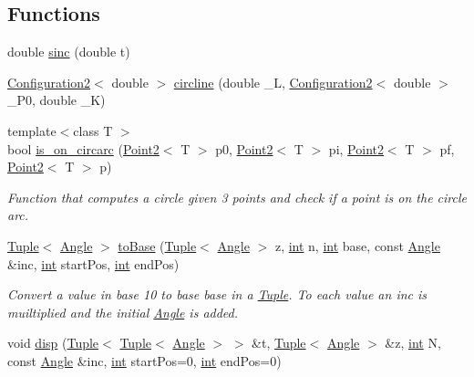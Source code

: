 \subsection*{Functions}
\begin{DoxyCompactItemize}
\item 
double \mbox{\hyperlink{dubins_8hh_a2678c9ac5e8585534a9c5a2385169324}{sinc}} (double t)
\item 
\mbox{\hyperlink{class_configuration2}{Configuration2}}$<$ double $>$ \mbox{\hyperlink{dubins_8hh_adef8b363044d7fed558e5b47d8d6a3a0}{circline}} (double \+\_\+L, \mbox{\hyperlink{class_configuration2}{Configuration2}}$<$ double $>$ \+\_\+\+P0, double \+\_\+K)
\item 
{\footnotesize template$<$class T $>$ }\\bool \mbox{\hyperlink{dubins_8hh_a301ba17400a2911095c4fcba0a9b7174}{is\+\_\+on\+\_\+circarc}} (\mbox{\hyperlink{class_point2}{Point2}}$<$ T $>$ p0, \mbox{\hyperlink{class_point2}{Point2}}$<$ T $>$ pi, \mbox{\hyperlink{class_point2}{Point2}}$<$ T $>$ pf, \mbox{\hyperlink{class_point2}{Point2}}$<$ T $>$ p)
\begin{DoxyCompactList}\small\item\em Function that computes a circle given 3 points and check if a point is on the circle arc. \end{DoxyCompactList}\item 
\mbox{\hyperlink{class_tuple}{Tuple}}$<$ \mbox{\hyperlink{class_angle}{Angle}} $>$ \mbox{\hyperlink{dubins_8hh_a24a357b93081a0180dfec16136bc8ff7}{to\+Base}} (\mbox{\hyperlink{class_tuple}{Tuple}}$<$ \mbox{\hyperlink{class_angle}{Angle}} $>$ z, \mbox{\hyperlink{draw_8hh_aa620a13339ac3a1177c86edc549fda9b}{int}} n, \mbox{\hyperlink{draw_8hh_aa620a13339ac3a1177c86edc549fda9b}{int}} base, const \mbox{\hyperlink{class_angle}{Angle}} \&inc, \mbox{\hyperlink{draw_8hh_aa620a13339ac3a1177c86edc549fda9b}{int}} start\+Pos, \mbox{\hyperlink{draw_8hh_aa620a13339ac3a1177c86edc549fda9b}{int}} end\+Pos)
\begin{DoxyCompactList}\small\item\em Convert a value in base 10 to base {\ttfamily base} in a {\ttfamily \mbox{\hyperlink{class_tuple}{Tuple}}}. To each value an inc is muiltiplied and the initial {\ttfamily \mbox{\hyperlink{class_angle}{Angle}}} is added. \end{DoxyCompactList}\item 
void \mbox{\hyperlink{dubins_8hh_a16cf89e561eae9ea10a39e40432af238}{disp}} (\mbox{\hyperlink{class_tuple}{Tuple}}$<$ \mbox{\hyperlink{class_tuple}{Tuple}}$<$ \mbox{\hyperlink{class_angle}{Angle}} $>$ $>$ \&t, \mbox{\hyperlink{class_tuple}{Tuple}}$<$ \mbox{\hyperlink{class_angle}{Angle}} $>$ \&z, \mbox{\hyperlink{draw_8hh_aa620a13339ac3a1177c86edc549fda9b}{int}} N, const \mbox{\hyperlink{class_angle}{Angle}} \&inc, \mbox{\hyperlink{draw_8hh_aa620a13339ac3a1177c86edc549fda9b}{int}} start\+Pos=0, \mbox{\hyperlink{draw_8hh_aa620a13339ac3a1177c86edc549fda9b}{int}} end\+Pos=0)

\end{DoxyCompactItemize}
